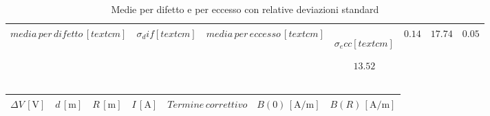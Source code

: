 \documentclass[]{article}
\begin{document}
\begin{table}
    \centering

    \begin{tabular} {||c|c||c|c||}
        \hline
        $ media \, per \, difetto\, [text{cm}] $ & $\sigma_dif [text{cm}] $ & $ media \, per \, eccesso\, [text{cm}] $ & $\sigma_ecc [text{cm}] $

        $ 13.52 $ & $ 0.14 $ & $ 17.74 $ & $ 0.05 $ \\\hline

    \end{tabular}
    \caption{Medie per difetto e per eccesso con relative deviazioni standard}
    \label{media_devst_Rb}

\end{table}


    \begin{table}
        \centering

    \begin{tabular}{||c|c|c|c|c|c|c||}
        \hline
        $\Delta V\, [\text{V}] $ & $d\, [\text{m}] $ & $R\, [\text{m}] $ & $I\, [\text{A}] $ & $Termine \, correttivo $ & $B(0)\, [\text{A/m}] $ & $B(R)\, [\text{A/m}] $\\
        \hline\hline



\end{tabular}
\end{table}
\end{document}
